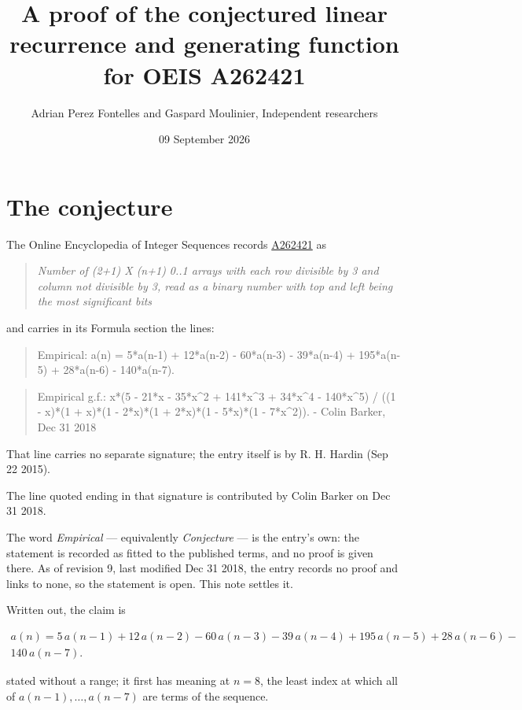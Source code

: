 \documentclass[11pt]{article}
\title{A proof of the conjectured linear recurrence and generating function for OEIS A262421}
\author{Adrian Perez Fontelles and Gaspard Moulinier, Independent researchers}
\date{09 September 2026}
\theoremstyle{definition}
\begin{document}
\maketitle
\section{The conjecture}

The Online Encyclopedia of Integer Sequences records \href{https://oeis.org/A262421}{A262421} as

\begin{quote}\itshape Number of (2+1) X (n+1) 0..1 arrays with each row divisible by 3 and column not divisible by 3, read as a binary number with top and left being the most significant bits\end{quote}

and carries in its Formula section the lines:

\begin{quote}\ttfamily Empirical: a(n) = 5*a(n-1) + 12*a(n-2) - 60*a(n-3) - 39*a(n-4) + 195*a(n-5) + 28*a(n-6) - 140*a(n-7).\end{quote}

\begin{quote}\ttfamily Empirical g.f.: x*(5 - 21*x - 35*x\textasciicircum{}2 + 141*x\textasciicircum{}3 + 34*x\textasciicircum{}4 - 140*x\textasciicircum{}5) / ((1 - x)*(1 + x)*(1 - 2*x)*(1 + 2*x)*(1 - 5*x)*(1 - 7*x\textasciicircum{}2)). - Colin Barker, Dec 31 2018\end{quote}

That line carries no separate signature; the entry itself is by R. H. Hardin (Sep 22 2015).

The line quoted ending in that signature is contributed by Colin Barker on Dec 31 2018.

The word {\itshape Empirical} --- equivalently {\itshape Conjecture} --- is the entry's own: the statement is recorded as fitted to the published terms, and no proof is given there. As of revision 9, last modified Dec 31 2018, the entry records no proof and links to none, so the statement is open. This note settles it.

Written out, the claim is

\begin{multline*} a(n) = 5\,a(n-1) + 12\,a(n-2) - 60\,a(n-3) - 39\,a(n-4) + 195\,a(n-5) + 28\,a(n-6) - \\ 140\,a(n-7). \end{multline*}

stated without a range; it first has meaning at $n = 8$, the least index at which all of $a(n-1),\dots,a(n-7)$ are terms of the sequence.
\end{document}
